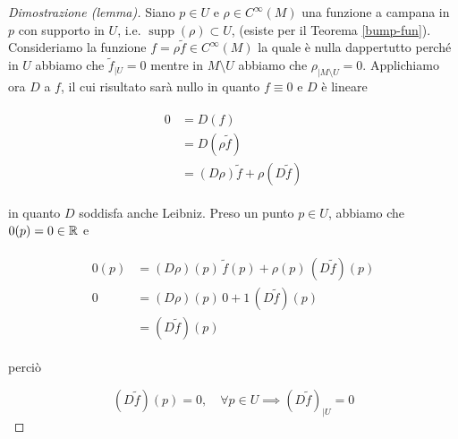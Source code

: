 \begin{proof}[Dimostrazione (lemma)]
	Siano $ p \in U $ e $ \rho \in C^{\infty}(M) $ una funzione a campana in $ p $ con supporto in $ U $, i.e. $ \operatorname{supp}(\rho) \subset U $, (esiste per il Teorema \ref{bump-fun}). Consideriamo la funzione $ f = \rho \tilde{f} \in C^{\infty}(M) $ la quale è nulla dappertutto perché in $ U $ abbiamo che $ \tilde{f}_{|U} = 0 $ mentre in $ M \setminus U $ abbiamo che $ \rho_{|M \setminus U} = 0 $. Applichiamo ora $ D $ a $ f $, il cui risultato sarà nullo in quanto $ f \equiv 0 $ e $ D $ è lineare
	
	\begin{align}
		\begin{split}
			0 &= D(f)\\
			&= D (\rho \tilde{f})\\
			&= (D \rho) \tilde{f} + \rho (D \tilde{f})
		\end{split}
	\end{align}

	in quanto $ D $ soddisfa anche Leibniz. Preso un punto $ p \in U $, abbiamo che $ 0(p) = 0 \in \mathbb{R} $ e
	
	\begin{align}
		\begin{split}
			0(p) &= (D \rho)(p) \, \tilde{f}(p) + \rho(p) \, (D \tilde{f})(p)\\
			0 &= (D \rho)(p) \, 0 + 1 \, (D \tilde{f})(p)\\
			&= (D \tilde{f})(p)
		\end{split}
	\end{align}

	perciò
	
	\begin{equation}
		(D \tilde{f})(p) = 0, \quad \forall p \in U \implies (D \tilde{f})_{|U} = 0
	\end{equation}
\end{proof}

